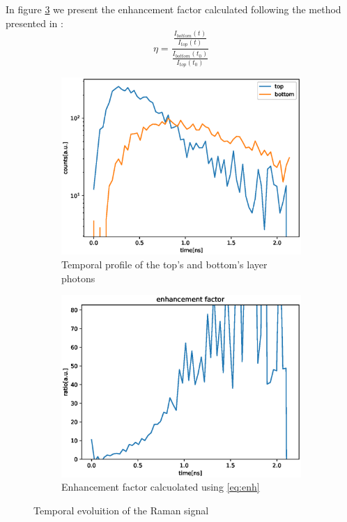 \documentclass{osa-article}
\begin{document}
In figure \ref{fig:enh} we present the enhancement factor calculated following the method presented in \cite{Sekar2017}:
\begin{equation}
\eta= \frac{\frac{I_{bottom}(t)}{I_{top}(t)}}{\frac{I_{bottom}(t_0)}{I_{top}(t_0)}} 
\label{eq:enh}
\end{equation}
\begin{figure}
\begin{subfigure}{0.5\linewidth}
    \centering
    \includegraphics[scale = 0.4]{figure/top_bottom_time.eps}
    \caption{Temporal profile of the top's and bottom's layer photons}
    \label{fig:Raman_tProfile}
\end{subfigure}
\begin{subfigure}{0.5\linewidth}
    \centering
    \includegraphics[scale = 0.4]{figure/enh.eps}
    \caption{Enhancement factor calcuolated using \ref{eq:enh}}
    \label{fig:enh}
\end{subfigure}
    \caption{Temporal evoluition of the Raman signal}
\end{figure}
\end{document}
